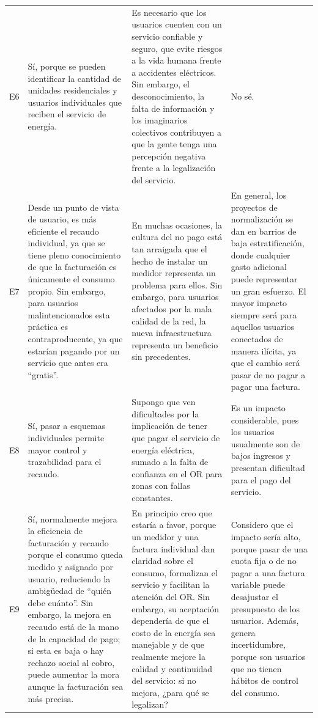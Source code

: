 \begin{longtable}{>{\centering}p{0.7cm}
                  >{\RaggedRight}p{4.5cm}
                  >{\RaggedRight}p{4.5cm}
                  >{\RaggedRight\arraybackslash}p{4.5cm}}
\rowcolor{grisclaro}
E6  & Sí, porque se pueden identificar la cantidad de unidades residenciales y usuarios individuales que reciben el servicio de energía. & Es necesario que los usuarios cuenten con un servicio confiable y seguro, que evite riesgos a la vida humana frente a accidentes eléctricos. Sin embargo, el desconocimiento, la falta de información y los imaginarios colectivos contribuyen a que la gente tenga una percepción negativa frente a la legalización del servicio. & No sé. \\
E7  & Desde un punto de vista de usuario, es más eficiente el recaudo individual, ya que se tiene pleno conocimiento de que la facturación es únicamente el consumo propio. Sin embargo, para usuarios malintencionados esta práctica es contraproducente, ya que estarían pagando por un servicio que antes era ``gratis''. & En muchas ocasiones, la cultura del no pago está tan arraigada que el hecho de instalar un medidor representa un problema para ellos. Sin embargo, para usuarios afectados por la mala calidad de la red, la nueva infraestructura representa un beneficio sin precedentes. & En general, los proyectos de normalización se dan en barrios de baja estratificación, donde cualquier gasto adicional puede representar un gran esfuerzo. El mayor impacto siempre será para aquellos usuarios conectados de manera ilícita, ya que el cambio será pasar de no pagar a pagar una factura. \\
\rowcolor{grisclaro}
E8  & Sí, pasar a esquemas individuales permite mayor control y trazabilidad para el recaudo. & Supongo que ven dificultades por la implicación de tener que pagar el servicio de energía eléctrica, sumado a la falta de confianza en el OR para zonas con fallas constantes. & Es un impacto considerable, pues los usuarios usualmente son de bajos ingresos y presentan dificultad para el pago del servicio. \\
E9  & Sí, normalmente mejora la eficiencia de facturación y recaudo porque el consumo queda medido y asignado por usuario, reduciendo la ambigüedad de ``quién debe cuánto''. Sin embargo, la mejora en recaudo está de la mano de la capacidad de pago; si esta es baja o hay rechazo social al cobro, puede aumentar la mora aunque la facturación sea más precisa. & En principio creo que estaría a favor, porque un medidor y una factura individual dan claridad sobre el consumo, formalizan el servicio y facilitan la atención del OR. Sin embargo, su aceptación dependería de que el costo de la energía sea manejable y de que realmente mejore la calidad y continuidad del servicio: si no mejora, ¿para qué se legalizan? & Considero que el impacto sería alto, porque pasar de una cuota fija o de no pagar a una factura variable puede desajustar el presupuesto de los usuarios. Además, genera incertidumbre, porque son usuarios que no tienen hábitos de control del consumo. \\

\end{longtable}
